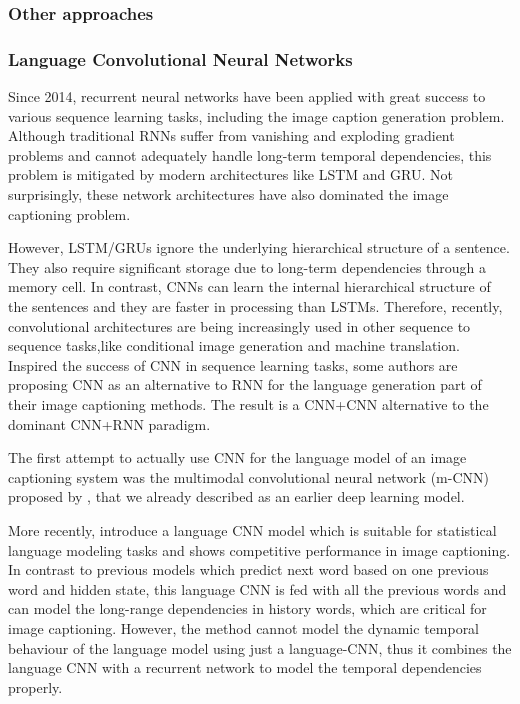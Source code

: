 \subsubsection{Other approaches}

\subsubsection{Language Convolutional Neural Networks}

Since 2014, recurrent neural networks have been applied with great success to various sequence learning tasks, including the image caption generation problem. Although traditional RNNs suffer from vanishing and exploding gradient problems and cannot adequately handle long-term temporal dependencies, this problem is mitigated by modern architectures like LSTM \cite{Hochreiter1997} and GRU\citep{Chung2014}. Not surprisingly, these network architectures have also dominated the image captioning problem. 

However, LSTM/GRUs ignore the underlying hierarchical structure of a sentence. They also require significant storage due to long-term dependencies through a memory cell. In contrast, CNNs can learn the internal hierarchical structure of the sentences and they are faster in processing than LSTMs. Therefore, recently, convolutional architectures are being increasingly used in other sequence to sequence tasks,like conditional image generation and machine translation. Inspired the success of CNN in sequence learning tasks, some authors are proposing CNN as an alternative to RNN for the language generation part of their image captioning methods. The result is a CNN+CNN alternative to the dominant CNN+RNN paradigm.

The first attempt to actually use CNN for the language model of an image captioning system was the multimodal convolutional neural network (m-CNN) proposed by \citet{Ma2015}, that we already described as an earlier deep learning model. 

More recently, \citet{Gu2017} introduce a language CNN model which is suitable for statistical language modeling tasks and shows competitive performance in image captioning. In contrast to previous models which predict next word based on one previous word and hidden state, this language CNN is fed with all the previous words and can model the long-range dependencies in history words, which are critical for image captioning. However, the method cannot model the dynamic temporal behaviour of the language model using just a language-CNN, thus it combines the language CNN with a recurrent network to model the temporal dependencies properly.

